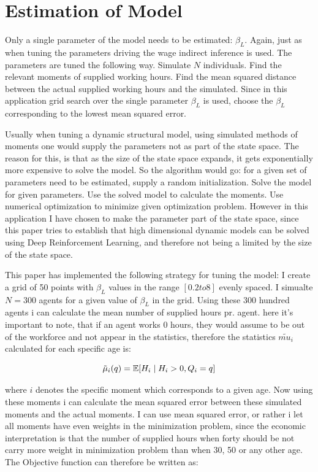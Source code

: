 \section{Estimation of Model}

Only a single parameter of the model needs to be estimated: $\beta_L$. Again, just as when tuning the parameters driving the wage indirect inference is used. The parameters are tuned the following way. Simulate $N$ individuals. Find the relevant moments of supplied working hours. Find the mean squared distance between the actual supplied working hours and the simulated. Since in this application grid search over the single parameter $\beta_L$ is used, choose the $\beta_L$ corresponding to the lowest mean squared error.

Usually when tuning a dynamic structural model, using simulated methods of moments one would supply the parameters not as part of the state space. The reason for this, is that as the size of the state space expands, it gets exponentially more expensive to solve the model. So the algorithm would go: for a given set of parameters need to be estimated, supply a random initialization. Solve the model for given parameters. Use the solved model to calculate the moments. Use numerical optimization to minimize given optimization problem. However in this application I have chosen to make the parameter part of the state space, since this paper tries to establish that high dimensional dynamic models can be solved using Deep Reinforcement Learning, and therefore not being a limited by the size of the state space.

This paper has implemented the following strategy for tuning the model: I create a grid of 50 points with $\beta_L$ values in the range $[0.2 to 8]$ evenly spaced. I simualte $N=300$ agents for a given value of $\beta_L$ in the grid. Using these 300 hundred agents i can calculate the mean number of supplied hours pr. agent. here it's important to note, that if an agent works 0 hours, they would assume to be out of the workforce and not appear in the statistics, therefore the statistics $\tilde{mu_i}$ calculated for each specific age is:

\begin{equation}
    \tilde{\mu}_i(q) = \mathbb{E} [ H_i \mid H_i > 0, Q_i = q] 
\end{equation}

where $i$ denotes the specific moment which corresponds to a given age. Now using these moments i can calculate the mean squared error between these simulated moments and the actual moments. I can use mean squared error, or rather i let all moments have even weights in the minimization problem, since the economic interpretation is that the number of supplied hours when forty should be not carry more weight in minimization problem than when 30, 50 or any other age. The Objective function can therefore be written as:

